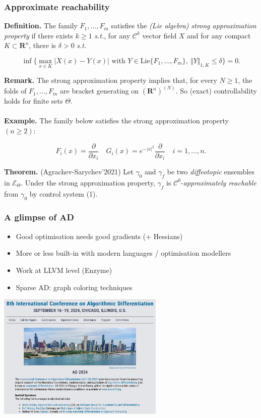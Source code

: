 \documentclass[9pt]{beamer}
\def\R{\mathbf{R}}
\begin{document}
\begin{frame}
\frametitle{\bf Approximate reachability}

\textbf{Definition.} The family $F_1,\ldots,F_m$ satisfies the \emph{(Lie
algebra) strong approximation property} if there exists $k
\geq 1$ \emph{s.t.}, for any $\mathscr{C}^k$ vector field $X$ and for any compact $K
\subset \R^n$, there is $\delta > 0$ \emph{s.t.}

\[ \inf \lbrace \max_{x \in K} |X(x)-Y(x)| \text{ with } Y \in \text{Lie} \lbrace  F_1,\ldots,F_m \rbrace,\ \Vert Y \Vert_{1,K} \leq \delta \rbrace = 0. \]

\textbf{Remark.} The strong approximation property implies that, for
every $N \geq 1$, the folds of $F_1,\ldots,F_m$ are bracket generating on
$(\R^n)^{(N)}$. So (exact) controllability holds for finite sets $\Theta$.\\
\ \\
\textbf{Example.} The family below satisfies the strong approximation
property $(n \geq 2)$:

\[ F_i(x) = \frac{\partial}{\partial x_i}\quad 
  G_i(x) = e^{-|x|^2} \frac{\partial}{\partial x_i}\quad i=1,\ldots,n. \]

\textbf{Theorem.} (Agrachev-Sarychev'2021) Let $\gamma_0$ and $\gamma_f$ be two \emph{diffeotopic}
ensembles in $\mathscr{E}_\Theta$. Under the strong approximation property, $\gamma_f$
is $\mathscr{C}^0$-\emph{approximately reachable} from $\gamma_0$ by control system (1).\\

\end{frame}

\begin{frame}
\frametitle{\bf A glimpse of AD}
\begin{itemize}
\item Good optimisation needs good gradients (+ Hessians)
\item More or less built-in with modern languages / optimisation modellers
\item Work at LLVM level (Enzyme)
\item Sparse AD: graph coloring techniques
\end{itemize}

\centering \includegraphics[height=6.0cm]{ad2024}

\end{frame}
\end{document}
